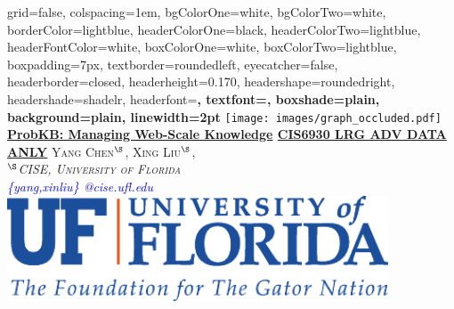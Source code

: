 \documentclass[landscape,final,a0paper,fontscale=0.285]{baposter}
\begin{document}
\begin{poster}%
  {
  grid=false,
  colspacing=1em,
  bgColorOne=white,
  bgColorTwo=white,
  borderColor=lightblue,
  headerColorOne=black,
  headerColorTwo=lightblue,
  headerFontColor=white,
  boxColorOne=white,
  boxColorTwo=lightblue,
  boxpadding=7px,
  textborder=roundedleft,
  eyecatcher=false,
  headerborder=closed,
  headerheight=0.170\textheight,
  headershape=roundedright,
  headershade=shadelr,
  headerfont=\Large\bf\textsc, %
  textfont={\setlength{\parindent}{1.5em}},
  boxshade=plain,
  background=plain,
  linewidth=2pt
  }
  {\texttt{[image: images/graph\_occluded.pdf]}}
  {\vspace*{.3em}\bf{\underline{ProbKB: Managing Web-Scale Knowledge}}\vspace{0.1em}
      {\newline\Large\underline{CIS6930 LRG ADV DATA ANLY}}\vspace{0.1em}}
  {\textsc{Yang Chen$^{\S}$, Xing Liu$^{\S}$, \\[0.1em]
                    {$^{\S}$\textit{CISE, University of Florida} }}\\[0.1em]
             {\textit{\textcolor{blue} {\{yang,xinliu\} @cise.ufl.edu}}}}
  {%
    \includegraphics[height=8.5em]{logo/UF_Signature_Themeline.pdf}
  }\vspace{-3mm}

    \newcommand{\colouredcircle}{%
      \tikz{\useasboundingbox (-0.2em,-0.32em) rectangle(0.2em,0.32em); \draw[draw=black,fill=lightblue,line width=0.03em] (0,0) circle(0.18em);}}


\end{poster}
\end{document}
